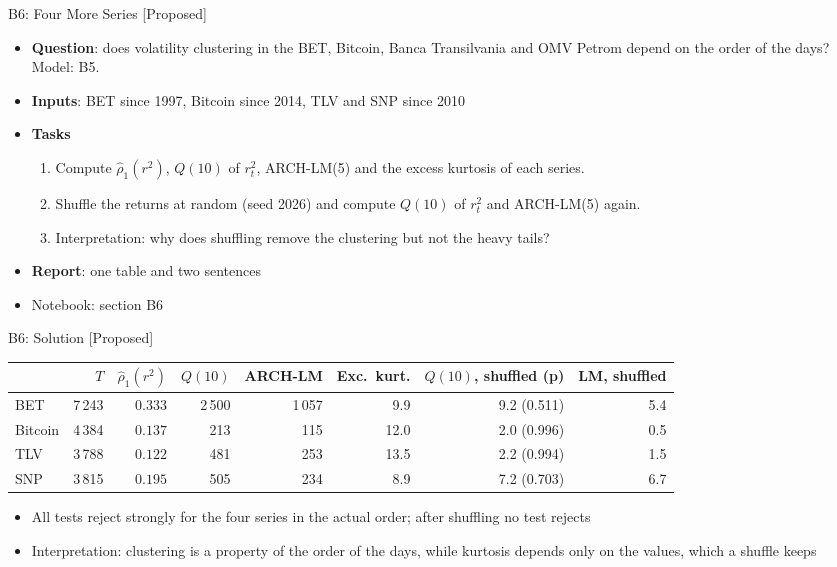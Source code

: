 \begin{frame}{B6: Four More Series [Proposed]}
\itemsize{\footnotesize}
\begin{itemize}
\item \textbf{Question}: does volatility clustering in the BET, Bitcoin, Banca Transilvania and OMV Petrom depend on the order of the days? Model: B5.
\item \textbf{Inputs}: BET since 1997, Bitcoin since 2014, TLV and SNP since 2010
\item \textbf{Tasks}
\begin{enumerate}
    \item Compute $\hat\rho_1(r^2)$, $Q(10)$ of $r_t^2$, ARCH-LM(5) and the excess kurtosis of each series.
    \item Shuffle the returns at random (seed 2026) and compute $Q(10)$ of $r_t^2$ and ARCH-LM(5) again.
    \item Interpretation: why does shuffling remove the clustering but not the heavy tails?
\end{enumerate}
\item \textbf{Report}: one table and two sentences
\item Notebook: section B6
\end{itemize}
\end{frame}

\ifsolutions
\begin{frame}{B6: Solution [Proposed]}
\itemsize{\footnotesize}
\begin{center}
\footnotesize
\begin{tabular}{lrrrrrrr}
\toprule
& $T$ & $\hat\rho_1(r^2)$ & $Q(10)$ & ARCH-LM & \textbf{Exc.\ kurt.} & $Q(10)$, \textbf{shuffled} (p) & \textbf{LM, shuffled} \\
\midrule
BET & 7\,243 & $0.333$ & 2\,500 & 1\,057 & 9.9 & 9.2 (0.511) & 5.4 \\
Bitcoin & 4\,384 & $0.137$ & 213 & 115 & 12.0 & 2.0 (0.996) & 0.5 \\
TLV & 3\,788 & $0.122$ & 481 & 253 & 13.5 & 2.2 (0.994) & 1.5 \\
SNP & 3\,815 & $0.195$ & 505 & 234 & 8.9 & 7.2 (0.703) & 6.7 \\
\bottomrule
\end{tabular}
\end{center}
\begin{itemize}
    \item All tests reject strongly for the four series in the actual order; after shuffling no test rejects
    \item Interpretation: clustering is a property of the order of the days, while kurtosis depends only on the values, which a shuffle keeps
\end{itemize}
\end{frame}
\fi

